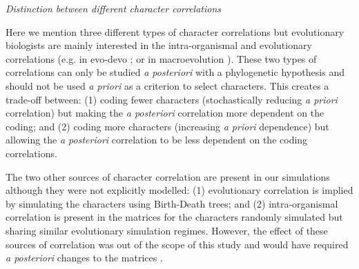 \documentclass[12pt,letterpaper]{article}
\renewcommand{\subsection}[1]{%
\bigskip
\begin{center}
\begin{large}
\normalfont\itshape #1
\end{large}
\end{center}}
\begin{document}
\subsection{Distinction between different character correlations}
Here we mention three different types of character correlations but evolutionary biologists are mainly interested in the intra-organismal and evolutionary correlations (e.g. in evo-devo \citealt{goswami2006morphological}; or in macroevolution \citealt{fitzjohn2014much}).
These two types of correlations can only be studied \textit{a posteriori} with a phylogenetic hypothesis and should not be used \textit{a priori} as a criterion to select characters. %
This creates a trade-off between: (1) coding fewer characters (stochastically reducing \textit{a priori} correlation) but making the \textit{a posteriori} correlation more dependent on the coding;
and (2) coding more characters (increasing \textit{a priori} dependence) but allowing the \textit{a posteriori} correlation to be less dependent on the coding correlations.

The two other sources of character correlation are present in our simulations although they were not explicitly modelled:
(1) evolutionary correlation is implied by simulating the characters using Birth-Death trees;
and (2) intra-organismal correlation is present in the matrices for the characters randomly simulated but sharing similar evolutionary simulation regimes.%
However, the effect of these sources of correlation was out of the scope of this study and would have required \textit{a posteriori} changes to the matrices \citep{Lande1983,Maddison1990,Pagel1994}. %
\end{document}
